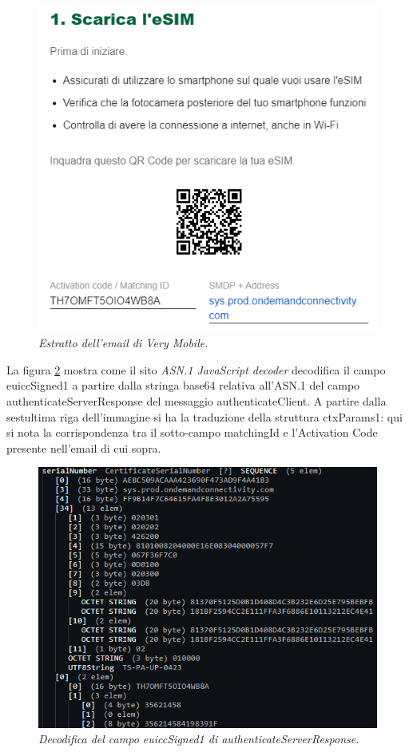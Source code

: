 \documentclass[10pt, oneside]{book}
\begin{document}
\begin{figure}
\includegraphics[width=\linewidth]{email.png}
\caption{\textit{Estratto dell'email di Very Mobile.}}
\label{fig:email}
\end{figure}
La figura \ref{fig:decode-euiccSigned1} mostra come il sito \textit{ASN.1 JavaScript decoder} decodifica il campo euiccSigned1 a partire dalla stringa base64 relativa all'ASN.1 del campo authenticateServerResponse del messaggio authenticateClient. A partire dalla sestultima riga dell'immagine si ha la traduzione della struttura ctxParams1: qui si nota la corrispondenza tra il sotto-campo matchingId e l'Activation Code presente nell'email di cui sopra.
\begin{figure}
\includegraphics[width=\linewidth]{decode-euiccSigned1.png}
\caption{\textit{Decodifica del campo euiccSigned1 di authenticateServerResponse.}}
\label{fig:decode-euiccSigned1}
\end{figure}
\end{document}

